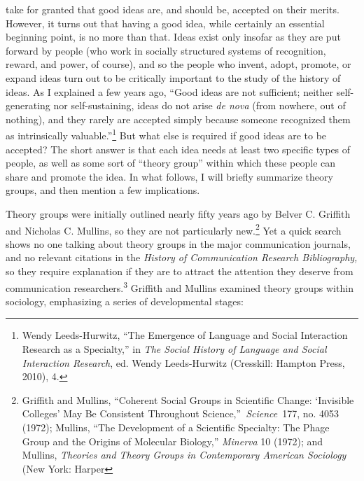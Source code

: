\documentclass{tufte-handout}
\begin{document}
\begin{titlepage}
 take for granted that good ideas are, and should be, accepted
on their merits. However, it turns out that having a good idea, while
certainly an essential beginning point, is no more than that. Ideas
exist only insofar as they are put forward by people (who work in
socially structured systems of recognition, reward, and power, of
course), and so the people who invent, adopt, promote, or expand ideas
turn out to be critically important to the study of the history of
ideas. As I explained a few years ago, ``Good ideas are not sufficient;
neither self-generating nor self-sustaining, ideas do not arise \emph{de
nova} (from nowhere, out of nothing), and they rarely are accepted
simply because someone recognized them as intrinsically
valuable.''\footnote{Wendy Leeds-Hurwitz, ``The Emergence of Language and Social
  Interaction Research as a Specialty,'' in \emph{The Social History of
  Language and Social Interaction Research}, ed. Wendy Leeds-Hurwitz
  (Cresskill: Hampton Press, 2010), 4.
} But what else is
required if good ideas are to be accepted? The short answer is that each
idea needs at least two specific types of people, as well as some sort
of ``theory group'' within which these people can share and promote the
idea. In what follows, I will briefly summarize theory groups, and then
mention  a few implications.

Theory groups were initially outlined nearly fifty years ago by Belver
C. Griffith and Nicholas C. Mullins, so they are not particularly
new.\footnote{Griffith and Mullins, ``Coherent Social Groups in Scientific Change:
  `Invisible Colleges' May Be Consistent Throughout
  Science,''~\emph{Science}~177, no. 4053 (1972); Mullins, ``The
  Development of a Scientific Specialty: The Phage Group and the Origins
  of Molecular Biology,'' \emph{Minerva} 10 (1972); and Mullins,
  \emph{Theories and Theory Groups in Contemporary American Sociology}
  (New York: Harper
} Yet a quick search shows no
one talking about theory groups in the major communication journals, and
no relevant citations in the \emph{History of Communication Research
Bibliography,} so they require explanation if they are to attract the
attention they deserve from communication
researchers.\textsuperscript{3} Griffith and Mullins
examined theory groups within sociology, emphasizing a series of
developmental stages:


\enlargethispage{2\baselineskip}

\vspace*{2em}





 \end{titlepage}
\end{document}
